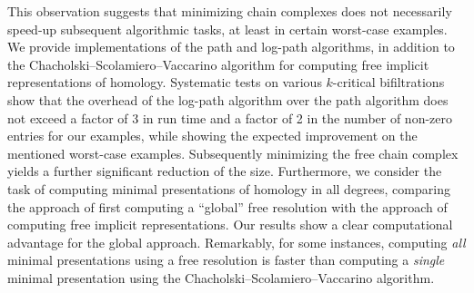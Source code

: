 This observation suggests that minimizing chain complexes does not necessarily speed-up subsequent algorithmic tasks, at least in certain worst-case examples.
%
%
%
We provide implementations of the path and log-path algorithms, in addition to the Chacholski--Scolamiero--Vaccarino algorithm for computing free implicit representations of homology.
Systematic tests on various $k$-critical bifiltrations show that the overhead of the log-path algorithm over the path algorithm does not exceed a factor of 3 in run time and a factor of 2 in the number of non-zero entries for our examples, while showing the expected improvement on the mentioned worst-case examples. 
Subsequently minimizing the free chain complex yields a further significant reduction of the size.
Furthermore, we consider the task of computing minimal presentations of homology in all degrees, comparing the approach of first computing a ``global'' free resolution with the approach of computing free implicit representations.
Our results show a clear computational advantage for the global approach.
Remarkably, for some instances, computing \emph{all} minimal
presentations using a free resolution is faster than computing a \emph{single} minimal presentation using the Chacholski--Scolamiero--Vaccarino algorithm.
%
%
